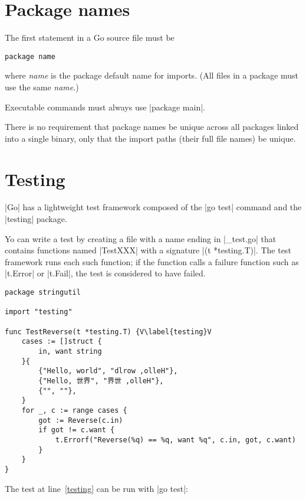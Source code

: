\section{Package names}

The first statement in a Go source file must be

\begin{verbatim}
package name
\end{verbatim}

where \emph{name} is the package default name for imports. (All files
in a package must use the same \emph{name}.)

Executable commands must always use |package main|.

There is no requirement that package names be unique across all packages linked into a single binary, only that the import paths (their full file names) be unique.

\section{Testing}

|Go| has a lightweight test framework composed of the |go test| command
and the |testing| package. 

Yo can write a test by creating a file with a name ending in |_test.go|
that contains functions named |TestXXX| with a signature |(t *testing.T)|. The test framework runs each such function; if the function calls a failure function such as |t.Error| or |t.Fail|, the test is considered to have failed.



\begin{verbatim}
package stringutil

import "testing"

func TestReverse(t *testing.T) {V\label{testing}V
	cases := []struct {
		in, want string
	}{
		{"Hello, world", "dlrow ,olleH"},
		{"Hello, 世界", "界世 ,olleH"},
		{"", ""},
	}
	for _, c := range cases {
		got := Reverse(c.in)
		if got != c.want {
			t.Errorf("Reverse(%q) == %q, want %q", c.in, got, c.want)
		}
	}
}
\end{verbatim}

The test at line~\ref{testing} can be run with |go test|:


